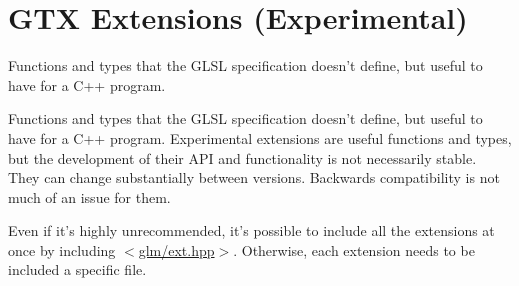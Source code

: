 \hypertarget{group__gtx}{\section{G\-T\-X Extensions (Experimental)}
\label{group__gtx}
}


Functions and types that the G\-L\-S\-L specification doesn't define, but useful to have for a C++ program.  


Functions and types that the G\-L\-S\-L specification doesn't define, but useful to have for a C++ program. Experimental extensions are useful functions and types, but the development of their A\-P\-I and functionality is not necessarily stable. They can change substantially between versions. Backwards compatibility is not much of an issue for them.

Even if it's highly unrecommended, it's possible to include all the extensions at once by including $<$\hyperlink{ext_8hpp_source}{glm/ext.\-hpp}$>$. Otherwise, each extension needs to be included a specific file. 